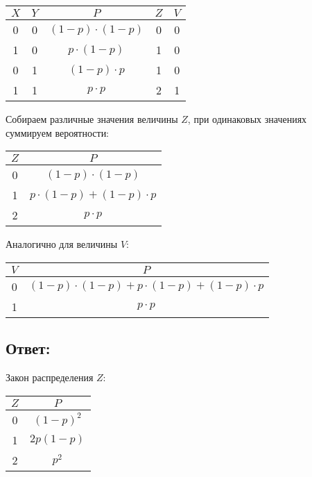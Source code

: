 \begin{tabular}{|c|c|c|c|c|}
    \hline
    $X$ & $Y$ & $P$                 & $Z$ & $V$ \\
    \hline
    0   & 0   & $(1-p) \cdot (1-p)$ & 0   & 0   \\
    \hline
    1   & 0   & $p \cdot (1-p)$     & 1   & 0   \\
    \hline
    0   & 1   & $(1-p) \cdot p$     & 1   & 0   \\
    \hline
    1   & 1   & $p \cdot p$         & 2   & 1   \\
    \hline
\end{tabular}

Собираем различные значения величины $Z$, при одинаковых значениях суммируем вероятности:

\begin{tabular}{|c|c|}
    \hline
    $Z$ & $P$                             \\
    \hline
    0   & $(1-p) \cdot (1-p)$             \\
    \hline
    1   & $p \cdot (1-p) + (1-p) \cdot p$ \\
    \hline
    2   & $p \cdot p$                     \\
    \hline
\end{tabular}

Аналогично для величины $V$:

\begin{tabular}{|c|c|}
    \hline
    $V$ & $P$                                                 \\
    \hline
    0   & $(1-p) \cdot (1-p) + p \cdot (1-p) + (1-p) \cdot p$ \\
    \hline
    1   & $p \cdot p$                                         \\
    \hline
\end{tabular}

\subsection*{Ответ:}
Закон распределения $Z$:

\begin{tabular}{|c|c|}
    \hline
    $Z$ & $P$         \\
    \hline
    0   & $(1-p)^2$   \\
    \hline
    1   & $2 p (1-p)$ \\
    \hline
    2   & $p^2$       \\
    \hline
\end{tabular}

